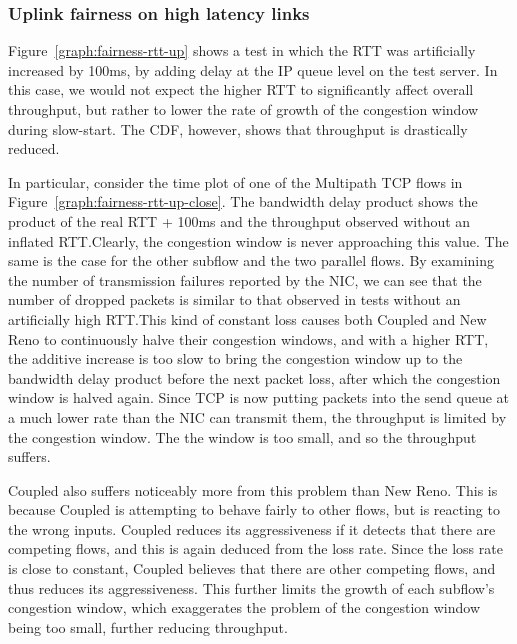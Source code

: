 \subsubsection{Uplink fairness on high latency links}

Figure~\ref{graph:fairness-rtt-up} shows a test in which the RTT was
artificially increased by 100ms, by adding delay at the IP queue level on the
test server. In this case, we would not expect the higher RTT to significantly
affect overall throughput, but rather to lower the rate of growth of the
congestion window during slow-start. The CDF, however, shows that throughput is
drastically reduced.

In particular, consider the time plot of one of the Multipath
TCP flows in Figure~\ref{graph:fairness-rtt-up-close}. The bandwidth delay product shows
the product of the real RTT + 100ms and the throughput observed without an
inflated RTT.\@ Clearly, the congestion window is never approaching this value.
The same is the case for the other subflow and the two parallel flows. By
examining the number of transmission failures reported by the NIC, we can see
that the number of dropped packets is similar to that observed in tests
without an artificially high RTT.\@ This kind of constant loss causes both Coupled
and New Reno to continuously halve their congestion windows, and with a higher
RTT, the additive increase is too slow to bring the congestion window up to the
bandwidth delay product before the next packet loss, after which the congestion 
window is halved again. Since TCP is now putting packets into the send queue at a
much lower rate than the NIC can transmit them, the throughput is limited by the 
congestion window. The the window is too small, and so the throughput suffers.

Coupled also suffers noticeably more from this problem than New Reno. This is
because Coupled is attempting to behave fairly to other flows, but is reacting to
the wrong inputs.  Coupled reduces its aggressiveness if it detects that there
are competing flows, and this is again deduced from the loss rate. Since the
loss rate is close to constant, Coupled believes that there are other competing
flows, and thus reduces its aggressiveness. This further limits the growth of
each subflow's congestion window, which exaggerates the problem of the
congestion window being too small, further reducing throughput.


